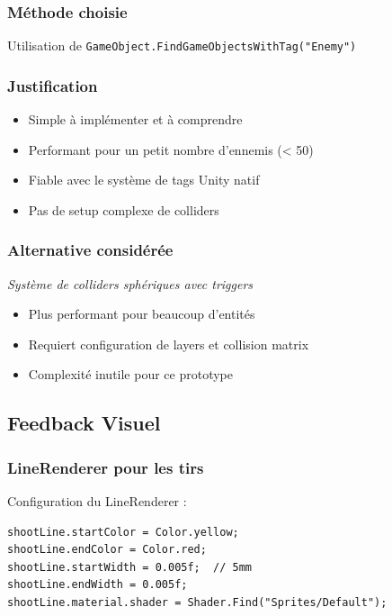 \documentclass[12pt,a4paper]{article}
\begin{document}
\subsubsection{Méthode choisie}
Utilisation de \texttt{GameObject.FindGameObjectsWithTag("Enemy")}

\subsubsection{Justification}
\begin{itemize}[label=$\checkmark$]
    \item Simple à implémenter et à comprendre
    \item Performant pour un petit nombre d'ennemis (< 50)
    \item Fiable avec le système de tags Unity natif
    \item Pas de setup complexe de colliders
\end{itemize}

\subsubsection{Alternative considérée}
\textit{Système de colliders sphériques avec triggers}
\begin{itemize}[label=$\times$]
    \item Plus performant pour beaucoup d'entités
    \item Requiert configuration de layers et collision matrix
    \item Complexité inutile pour ce prototype
\end{itemize}

\subsection{Feedback Visuel}

\subsubsection{LineRenderer pour les tirs}

Configuration du LineRenderer :
\begin{lstlisting}[caption=Configuration visuelle du tir]
shootLine.startColor = Color.yellow;
shootLine.endColor = Color.red;
shootLine.startWidth = 0.005f;  // 5mm
shootLine.endWidth = 0.005f;
shootLine.material.shader = Shader.Find("Sprites/Default");
\end{lstlisting}
\end{document}
